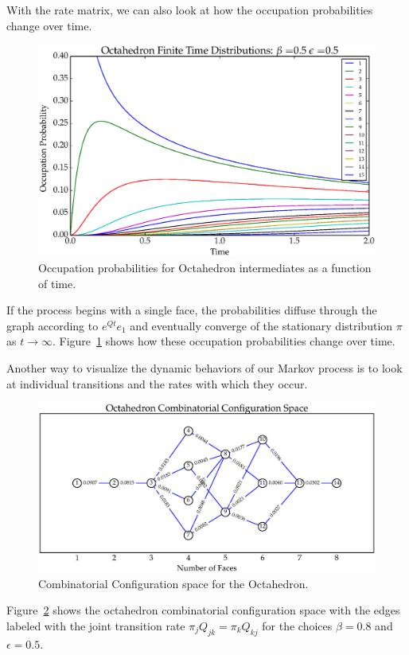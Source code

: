 With the rate matrix, we can also look at how the occupation probabilities change over time. 
\begin{figure}[ht]
\centering
  \includegraphics[scale=0.6]{images/octahedron_finite_dist.eps}
\caption{Occupation probabilities for Octahedron intermediates as a function of time.}
\label{fig:OctaFinDist}
\end{figure}
If the process begins with a single face, the probabilities diffuse through the graph according to $e^{Qt}e_1$ and eventually converge of the stationary distribution $\pi$ as $t \to \infty$. Figure~\ref{fig:OctaFinDist} shows how these occupation probabilities change over time.

Another way to visualize the dynamic behaviors of our Markov process is to look at individual transitions and the rates with which they occur.
\begin{figure}[ht]
\centering
  \includegraphics[scale=0.5]{images/octahedron_ccs.eps}
\caption{Combinatorial Configuration space for the Octahedron.}
\label{fig:OctaCCS}
\end{figure}
Figure~\ref{fig:OctaCCS} shows the octahedron combinatorial configuration space with the edges labeled with the joint transition rate $\pi_j Q_{jk} = \pi_k Q_{kj}$ for the choices $\beta = 0.8$ and $\epsilon = 0.5$.

